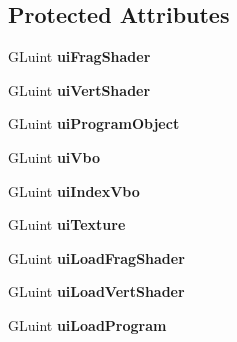 \subsection*{Protected Attributes}
\begin{DoxyCompactItemize}
\item 
\hypertarget{struct_s_a_p_i_handles_a0b1d5e38be8811fa5c2bacc332a54864}{G\+Luint {\bfseries ui\+Frag\+Shader}}\label{struct_s_a_p_i_handles_a0b1d5e38be8811fa5c2bacc332a54864}

\item 
\hypertarget{struct_s_a_p_i_handles_a9b7d0daa72d59d05932129943b39165d}{G\+Luint {\bfseries ui\+Vert\+Shader}}\label{struct_s_a_p_i_handles_a9b7d0daa72d59d05932129943b39165d}

\item 
\hypertarget{struct_s_a_p_i_handles_a456a98f5009b165528ac7e16e668ca2b}{G\+Luint {\bfseries ui\+Program\+Object}}\label{struct_s_a_p_i_handles_a456a98f5009b165528ac7e16e668ca2b}

\item 
\hypertarget{struct_s_a_p_i_handles_a541dff9afa74262ba95ff09fdb5cb30c}{G\+Luint {\bfseries ui\+Vbo}}\label{struct_s_a_p_i_handles_a541dff9afa74262ba95ff09fdb5cb30c}

\item 
\hypertarget{struct_s_a_p_i_handles_a73249e55de111bb67a0638519a2393a0}{G\+Luint {\bfseries ui\+Index\+Vbo}}\label{struct_s_a_p_i_handles_a73249e55de111bb67a0638519a2393a0}

\item 
\hypertarget{struct_s_a_p_i_handles_a4e7f73814d1492594b0c3a0e5e246aa2}{G\+Luint {\bfseries ui\+Texture}}\label{struct_s_a_p_i_handles_a4e7f73814d1492594b0c3a0e5e246aa2}

\item 
\hypertarget{struct_s_a_p_i_handles_a8894788f90cb2adb46c2dca7288fb057}{G\+Luint {\bfseries ui\+Load\+Frag\+Shader}}\label{struct_s_a_p_i_handles_a8894788f90cb2adb46c2dca7288fb057}

\item 
\hypertarget{struct_s_a_p_i_handles_a9116bea61282f09f8e6a72343607b68d}{G\+Luint {\bfseries ui\+Load\+Vert\+Shader}}\label{struct_s_a_p_i_handles_a9116bea61282f09f8e6a72343607b68d}

\item 
\hypertarget{struct_s_a_p_i_handles_a7f68aaf98ccf3a5879a597882410b9c6}{G\+Luint {\bfseries ui\+Load\+Program}}\label{struct_s_a_p_i_handles_a7f68aaf98ccf3a5879a597882410b9c6}


\end{DoxyCompactItemize}

